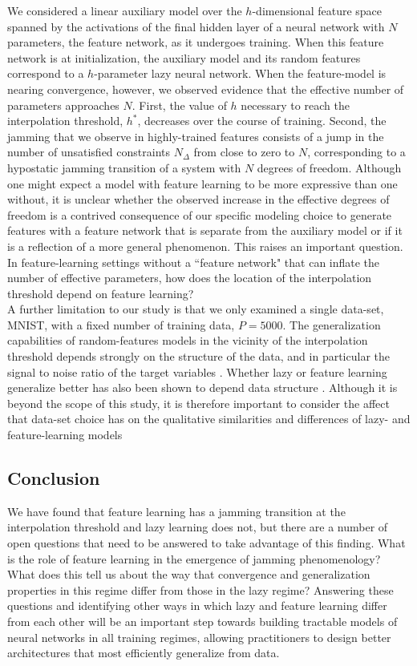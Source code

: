 \documentclass[11pt]{article}
\begin{document}
We considered a linear auxiliary model over the $h$-dimensional feature space spanned by the activations of the final hidden layer of a neural network with $N$ parameters, the feature network, as it undergoes training. When this feature network is at initialization, the auxiliary model and its random features correspond to a $h$-parameter lazy neural network. When the feature-model is nearing convergence, however, we observed evidence that the effective number of parameters approaches $N$. First, the value of $h$ necessary to reach the interpolation threshold, $h^*$, decreases over the course of training. Second, the jamming that we observe in highly-trained features consists of a jump in the number of unsatisfied constraints $N_\Delta$ from close to zero to $N$, corresponding to a hypostatic jamming transition of a system with $N$ degrees of freedom. Although one might expect a model with feature learning to be more expressive than one without, it is unclear whether the observed increase in the effective degrees of freedom is a contrived consequence of our specific modeling choice to generate features with a feature network that is separate from the auxiliary model or if it is a reflection of a more general phenomenon. This raises an important question. In feature-learning settings without a ``feature network" that can inflate the number of effective parameters, how does the location of the interpolation threshold depend on feature learning?\\ 

A further limitation to our study is that we only examined a single data-set, MNIST, with a fixed number of training data, $P=5000$. The generalization capabilities of random-features models in the vicinity of the interpolation threshold depends strongly on the structure of the data, and in particular the signal to noise ratio of the target variables \cite{meiGeneralizationErrorRandom2019}. Whether lazy or feature learning generalize better has also been shown to depend data structure \cite{geigerDisentanglingFeatureLazy2020}. Although it is beyond the scope of this study, it is therefore important to consider the affect that data-set choice has on the qualitative similarities and differences of lazy- and feature-learning models

\subsection{Conclusion}

We have found that feature learning has a jamming transition at the interpolation threshold and lazy learning does not, but there are a number of open questions that need to be answered to take advantage of this finding. What is the role of feature learning in the emergence of jamming phenomenology? What does this tell us about the way that convergence and generalization properties in this regime differ from those in the lazy regime? Answering these questions and identifying other ways in which lazy and feature learning differ from each other will be an important step towards building tractable models of neural networks in all training regimes, allowing practitioners to design better architectures that most efficiently generalize from data. \\
\end{document}
